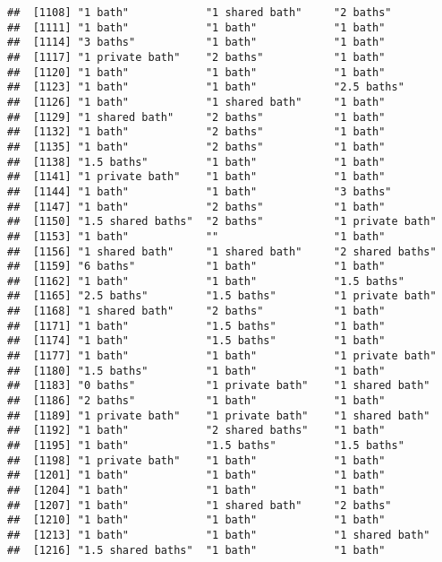 \documentclass[
]{article}
\begin{document}
\begin{verbatim}
##  [1108] "1 bath"            "1 shared bath"     "2 baths"          
##  [1111] "1 bath"            "1 bath"            "1 bath"           
##  [1114] "3 baths"           "1 bath"            "1 bath"           
##  [1117] "1 private bath"    "2 baths"           "1 bath"           
##  [1120] "1 bath"            "1 bath"            "1 bath"           
##  [1123] "1 bath"            "1 bath"            "2.5 baths"        
##  [1126] "1 bath"            "1 shared bath"     "1 bath"           
##  [1129] "1 shared bath"     "2 baths"           "1 bath"           
##  [1132] "1 bath"            "2 baths"           "1 bath"           
##  [1135] "1 bath"            "2 baths"           "1 bath"           
##  [1138] "1.5 baths"         "1 bath"            "1 bath"           
##  [1141] "1 private bath"    "1 bath"            "1 bath"           
##  [1144] "1 bath"            "1 bath"            "3 baths"          
##  [1147] "1 bath"            "2 baths"           "1 bath"           
##  [1150] "1.5 shared baths"  "2 baths"           "1 private bath"   
##  [1153] "1 bath"            ""                  "1 bath"           
##  [1156] "1 shared bath"     "1 shared bath"     "2 shared baths"   
##  [1159] "6 baths"           "1 bath"            "1 bath"           
##  [1162] "1 bath"            "1 bath"            "1.5 baths"        
##  [1165] "2.5 baths"         "1.5 baths"         "1 private bath"   
##  [1168] "1 shared bath"     "2 baths"           "1 bath"           
##  [1171] "1 bath"            "1.5 baths"         "1 bath"           
##  [1174] "1 bath"            "1.5 baths"         "1 bath"           
##  [1177] "1 bath"            "1 bath"            "1 private bath"   
##  [1180] "1.5 baths"         "1 bath"            "1 bath"           
##  [1183] "0 baths"           "1 private bath"    "1 shared bath"    
##  [1186] "2 baths"           "1 bath"            "1 bath"           
##  [1189] "1 private bath"    "1 private bath"    "1 shared bath"    
##  [1192] "1 bath"            "2 shared baths"    "1 bath"           
##  [1195] "1 bath"            "1.5 baths"         "1.5 baths"        
##  [1198] "1 private bath"    "1 bath"            "1 bath"           
##  [1201] "1 bath"            "1 bath"            "1 bath"           
##  [1204] "1 bath"            "1 bath"            "1 bath"           
##  [1207] "1 bath"            "1 shared bath"     "2 baths"          
##  [1210] "1 bath"            "1 bath"            "1 bath"           
##  [1213] "1 bath"            "1 bath"            "1 shared bath"    
##  [1216] "1.5 shared baths"  "1 bath"            "1 bath"           

\end{verbatim}
\end{document}
